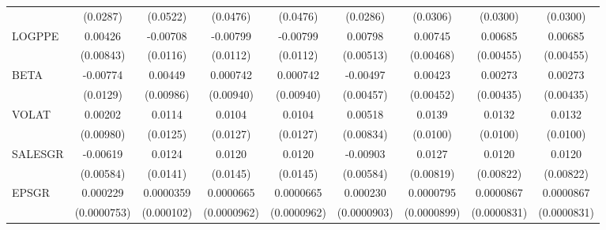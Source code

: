 \begin{table}[htbp]
\begin{tabular}{l*{8}{c}}
                    &    (0.0287)         &    (0.0522)         &    (0.0476)         &    (0.0476)         &    (0.0286)         &    (0.0306)         &    (0.0300)         &    (0.0300)         \\
LOGPPE              &     0.00426         &    -0.00708         &    -0.00799         &    -0.00799         &     0.00798         &     0.00745         &     0.00685         &     0.00685         \\
                    &   (0.00843)         &    (0.0116)         &    (0.0112)         &    (0.0112)         &   (0.00513)         &   (0.00468)         &   (0.00455)         &   (0.00455)         \\
BETA                &    -0.00774         &     0.00449         &    0.000742         &    0.000742         &    -0.00497         &     0.00423         &     0.00273         &     0.00273         \\
                    &    (0.0129)         &   (0.00986)         &   (0.00940)         &   (0.00940)         &   (0.00457)         &   (0.00452)         &   (0.00435)         &   (0.00435)         \\
VOLAT               &     0.00202         &      0.0114         &      0.0104         &      0.0104         &     0.00518         &      0.0139         &      0.0132         &      0.0132         \\
                    &   (0.00980)         &    (0.0125)         &    (0.0127)         &    (0.0127)         &   (0.00834)         &    (0.0100)         &    (0.0100)         &    (0.0100)         \\
SALESGR             &    -0.00619         &      0.0124         &      0.0120         &      0.0120         &    -0.00903         &      0.0127         &      0.0120         &      0.0120         \\
                    &   (0.00584)         &    (0.0141)         &    (0.0145)         &    (0.0145)         &   (0.00584)         &   (0.00819)         &   (0.00822)         &   (0.00822)         \\
EPSGR               &    0.000229\sym{***}&   0.0000359         &   0.0000665         &   0.0000665         &    0.000230\sym{**} &   0.0000795         &   0.0000867         &   0.0000867         \\
                    & (0.0000753)         &  (0.000102)         & (0.0000962)         & (0.0000962)         & (0.0000903)         & (0.0000899)         & (0.0000831)         & (0.0000831)         \\

\end{tabular}
\end{table}
